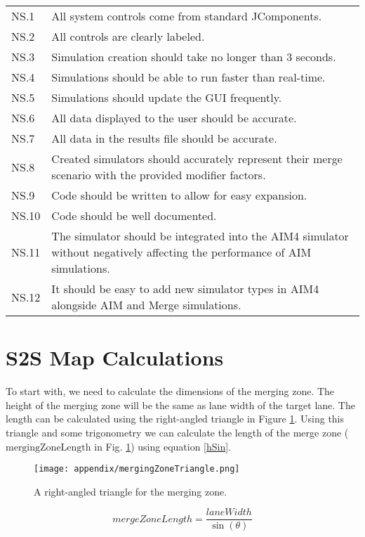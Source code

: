\begin{appendices}
\begin{longtable}{|p{0.1\linewidth}|p{0.9\linewidth}|}
NS.1 & All system controls come from standard JComponents. \\
NS.2 & All controls are clearly labeled. \\
NS.3 & Simulation creation should take no longer than 3 seconds. \\
NS.4 & Simulations should be able to run faster than real-time. \\
NS.5 & Simulations should update the GUI frequently. \\
NS.6 & All data displayed to the user should be accurate. \\
NS.7 & All data in the results file should be accurate. \\
NS.8 & Created simulators should accurately represent their merge scenario with the provided modifier factors. \\
NS.9 & Code should be written to allow for easy expansion. \\
NS.10 & Code should be well documented. \\
NS.11 & The simulator should be integrated into the AIM4 simulator without negatively affecting the performance of AIM simulations. \\
NS.12 & It should be easy to add new simulator types in AIM4 alongside AIM and Merge simulations. \\
\end{longtable}

\section{S2S Map Calculations}
\label{sec:S2SMapCalculations}
To start with, we need to calculate the dimensions of the merging zone. The height of the merging zone will be the same as lane width of the target lane. The length can be calculated using the right-angled triangle in Figure \ref{fig:mergingZoneTriangle}. Using this triangle and some trigonometry we can calculate the length of the merge zone ($\text{mergingZoneLength}$ in Fig. \ref{fig:mergingZoneTriangle}) using equation \ref{hSin}.

\begin{figure}[htb]
\centering
\texttt{[image: appendix/mergingZoneTriangle.png]}
\caption{A right-angled triangle for the merging zone.}
\label{fig:mergingZoneTriangle}
\end{figure}

\begin{equation}\label{hSin}
mergeZoneLength = \frac{laneWidth}{\sin(\theta)}
\end{equation}


\end{appendices}
